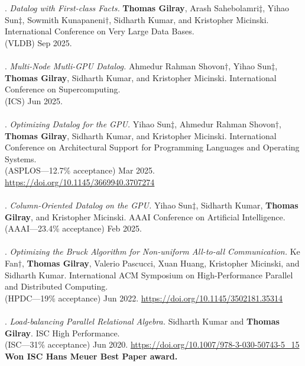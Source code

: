 \paper. \textit{Datalog with First-class Facts.}
\textbf{Thomas Gilray}, Arash Sahebolamri$\ddagger$, Yihao Sun$\ddagger$, Sowmith Kunapaneni$\dagger$, Sidharth Kumar, and Kristopher Micinski.
International Conference on Very Large Data Bases.
\\(VLDB) Sep 2025.
\\ \vspace{-0.1cm}\\
\paper. \textit{Multi-Node Mutli-GPU Datalog.}
Ahmedur Rahman Shovon$\dagger$, Yihao Sun$\ddagger$, \textbf{Thomas Gilray}, Sidharth Kumar, and Kristopher Micinski.
International Conference on Supercomputing.
\\(ICS) Jun 2025.
\\ \vspace{-0.1cm}\\
\paper. \textit{Optimizing Datalog for the GPU.}
Yihao Sun$\ddagger$, Ahmedur Rahman Shovon$\dagger$, \textbf{Thomas Gilray}, Sidharth Kumar, and Kristopher Micinski.
International Conference on Architectural Support for Programming Languages and Operating Systems.
\\(ASPLOS---12.7\% acceptance) Mar 2025. \url{https://doi.org/10.1145/3669940.3707274}
\\ \vspace{-0.1cm}\\
\paper. \textit{Column-Oriented Datalog on the GPU.}
Yihao Sun$\ddagger$, Sidharth Kumar, \textbf{Thomas Gilray}, and Kristopher Micinski.
AAAI Conference on Artificial Intelligence.
\\(AAAI---23.4\% acceptance) Feb 2025.
\\ \vspace{-0.1cm}\\
\paper. \textit{Optimizing the Bruck Algorithm for Non-uniform All-to-all Communication.}
Ke Fan$\dagger$, \textbf{Thomas Gilray}, Valerio Pascucci, Xuan Huang, Kristopher Micinski, and Sidharth Kumar.
International ACM Symposium on High-Performance Parallel and Distributed Computing.
\\(HPDC---19\% acceptance) Jun 2022. \url{https://doi.org/10.1145/3502181.35314}
\\ \vspace{-0.1cm}\\
\paper. \textit{Load-balancing Parallel Relational Algebra.}
Sidharth Kumar and \textbf{Thomas Gilray}.
ISC High Performance.
\\(ISC---31\% acceptance) Jun 2020. \url{https://doi.org/10.1007/978-3-030-50743-5_15}
\\\textbf{Won ISC Hans Meuer Best Paper award.} \\ \vspace{-0.1cm}\\
